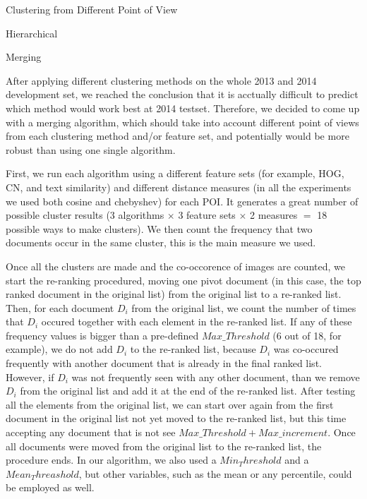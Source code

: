 \begin{subsection}{Clustering from Different Point of View}
\begin{subsubsection}{Hierarchical}
\end{subsubsection}

\begin{subsubsection}{Merging}

After applying different clustering methods on the whole 2013 and 2014 development set, 
we reached the conclusion that it is acctually difficult to predict which method would work best at 2014 testset.
Therefore, we decided to come up with a merging algorithm, which should take into account different point of views from each clustering method and/or feature set,
and potentially would be more robust than using one single algorithm.

First, we run each algorithm using a different feature sets (for example, HOG, CN, and text similarity) and different distance measures (in all the experiments we used both cosine and chebyshev) for each POI. It generates a great number of possible cluster results (3 algorithms $\times$ 3 feature sets $\times$ 2 measures $=$ 18 possible ways to make clusters). 
We then count the frequency that two documents occur in the same cluster, this is the main measure we used.

Once all the clusters are made and the co-occorence of images are counted, we start the re-ranking procedured, moving one pivot document (in this case, the top ranked document in the original list) from the original list to a re-ranked list. Then, for each document $D_i$ from the original list, we count the number of times that $D_i$ occured together with each element in the re-ranked list. 
If any of these frequency values is bigger than a pre-defined $Max\_Threshold$ (6 out of 18, for example), we do not add $D_i$ to the re-ranked list, because $D_i$ was co-occured frequently with another document that is already in the final ranked list. However, if $D_i$ was not frequently seen with any other document, than we remove $D_i$ from the original list and add it at the end of the re-ranked list.
After testing all the elements from the original list, we can start over again from the first document in the original list not yet moved to the re-ranked list, but this time accepting any document that is not see $Max\_Threshold + Max\_increment$. Once all documents were moved from the original list to the re-ranked list, the procedure ends.
In our algorithm, we also used a $Min_Threshold$ and a $Mean_Threashold$, but other variables, such as the mean or any percentile, could be employed as well.



\end{subsubsection}
\end{subsection}
